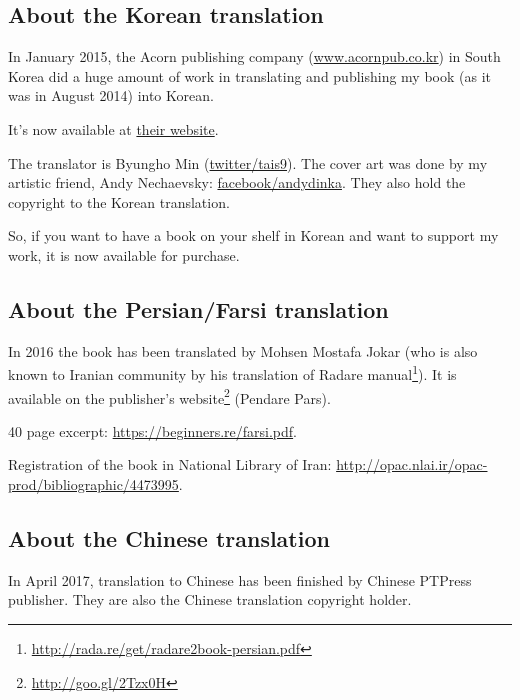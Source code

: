



\subsection*{About the Korean translation}

In January 2015, the Acorn publishing company (\href{http://www.acornpub.co.kr}{www.acornpub.co.kr}) in South Korea did a huge amount of work in translating and publishing 
my book (as it was in August 2014) into Korean.

It's now available at \href{http://go.yurichev.com/17343}{their website}.

\iffalse
\begin{figure}[H]
\centering
\texttt{[image: acorn\_cover.jpg]}
\end{figure}
\fi

The translator is Byungho Min (\href{http://go.yurichev.com/17344}{twitter/tais9}).
The cover art was done by my artistic friend, Andy Nechaevsky:
\href{http://go.yurichev.com/17023}{facebook/andydinka}.
They also hold the copyright to the Korean translation.

So, if you want to have a  book on your shelf in Korean and 
want to support my work, it is now available for purchase.

\subsection*{About the Persian/Farsi translation}

In 2016 the book has been translated by Mohsen Mostafa Jokar (who is also known to Iranian community by his translation of Radare manual\footnote{\url{http://rada.re/get/radare2book-persian.pdf}}).
It is available on the publisher’s website\footnote{\url{http://goo.gl/2Tzx0H}} (Pendare Pars).

40 page excerpt: \url{https://beginners.re/farsi.pdf}.

Registration of the book in National Library of Iran: \url{http://opac.nlai.ir/opac-prod/bibliographic/4473995}.

\subsection*{About the Chinese translation}

In April 2017, translation to Chinese has been finished by Chinese PTPress publisher. They are also the Chinese translation copyright holder. 

